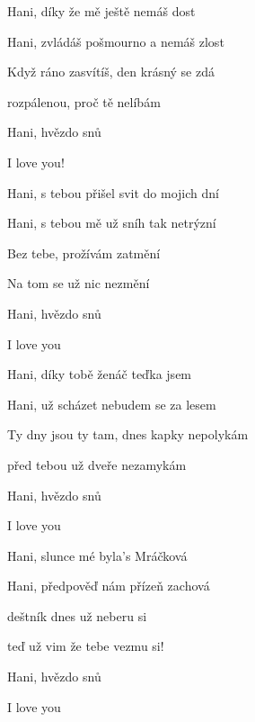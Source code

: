 

\zs
Hani, díky že mě ještě nemáš dost

Hani, zvládáš pošmourno a nemáš zlost

Když ráno zasvítíš, den krásný se zdá

rozpálenou, proč tě nelíbám

Hani, hvězdo snů

I love you!
\ks

\zs
Hani, s tebou přišel svit do mojich dní

Hani, s tebou mě už sníh tak netrýzní

Bez tebe, prožívám zatmění

Na tom se už nic nezmění

Hani, hvězdo snů

I love you
\ks

\zs
Hani, díky tobě ženáč teďka jsem

Hani, už scházet nebudem se za lesem

Ty dny jsou ty tam, dnes kapky nepolykám

před tebou už dveře nezamykám

Hani, hvězdo snů

I love you
\ks

\zs
Hani, slunce mé byla's Mráčková

Hani, předpověď nám přízeň zachová

deštník dnes už neberu si

teď už vim že tebe vezmu si!

Hani, hvězdo snů

I love you
\ks

\kp
